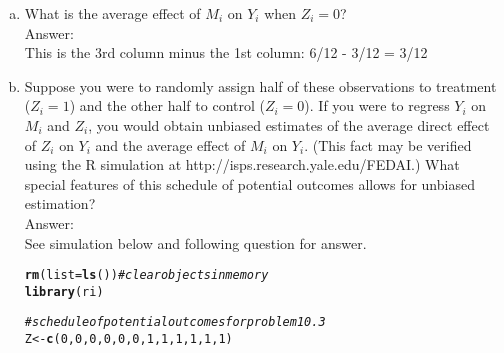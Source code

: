 \documentclass[11pt,notitlepage]{article}\usepackage[]{graphicx}\usepackage[]{color}
\makeatletter
\newcommand{\hlnum}[1]{\textcolor[rgb]{0.686,0.059,0.569}{#1}}%
\newcommand{\hlcom}[1]{\textcolor[rgb]{0.678,0.584,0.686}{\textit{#1}}}%
\newcommand{\hlstd}[1]{\textcolor[rgb]{0.345,0.345,0.345}{#1}}%
\newcommand{\hlkwb}[1]{\textcolor[rgb]{0.69,0.353,0.396}{#1}}%
\newcommand{\hlkwc}[1]{\textcolor[rgb]{0.333,0.667,0.333}{#1}}%
\newcommand{\hlkwd}[1]{\textcolor[rgb]{0.737,0.353,0.396}{\textbf{#1}}}%
\newenvironment{kframe}{%
 \def\at@end@of@kframe{}%
 \ifinner\ifhmode%
  \def\at@end@of@kframe{\end{minipage}}%
  \begin{minipage}{\columnwidth}%
 \fi\fi%
 \def\FrameCommand##1{\hskip\@totalleftmargin \hskip-\fboxsep
 \colorbox{shadecolor}{##1}\hskip-\fboxsep
     \hskip-\linewidth \hskip-\@totalleftmargin \hskip\columnwidth}%
 \MakeFramed {\advance\hsize-\width
   \@totalleftmargin\z@ \linewidth\hsize
   \@setminipage}}%
 {\par\unskip\endMakeFramed%
 \at@end@of@kframe}
\newenvironment{knitrout}{}{} %
\makeatother
\begin{document}
\begin{enumerate}[a)]
\item What is the average effect of $M_i$ on $Y_i$ when $Z_i = 0$?\\
Answer:\\
This is the 3rd column minus the 1st column: 6/12 - 3/12 = 3/12

\item Suppose you were to randomly assign half of these observations to treatment ($Z_i = 1$) and the other half to control ($Z_i = 0$). If you were to regress $Y_i$ on $M_i$ and $Z_i$, you would obtain unbiased estimates of the average direct effect of $Z_i$ on $Y_i$ and the average effect of $M_i$ on $Y_i$. (This fact may be verified using the R simulation at http://isps.research.yale.edu/FEDAI.) What special features of this schedule of potential outcomes allows for unbiased estimation?\\
Answer:\\
See simulation below and following question for answer.
\begin{knitrout}
\color{fgcolor}\begin{kframe}
\begin{alltt}
\hlkwd{rm}\hlstd{(}\hlkwc{list}\hlstd{=}\hlkwd{ls}\hlstd{())}       \hlcom{# clear objects in memory}
\hlkwd{library}\hlstd{(ri)}

\hlcom{# schedule of potential outcomes for problem 10.3}
\hlstd{Z} \hlkwb{<-} \hlkwd{c}\hlstd{(}\hlnum{0}\hlstd{,}\hlnum{0}\hlstd{,}\hlnum{0}\hlstd{,}\hlnum{0}\hlstd{,}\hlnum{0}\hlstd{,}\hlnum{0}\hlstd{,}\hlnum{1}\hlstd{,}\hlnum{1}\hlstd{,}\hlnum{1}\hlstd{,}\hlnum{1}\hlstd{,}\hlnum{1}\hlstd{,}\hlnum{1}\hlstd{)}


\end{alltt}
\end{kframe}
\end{knitrout}
\end{enumerate}
\end{document}
